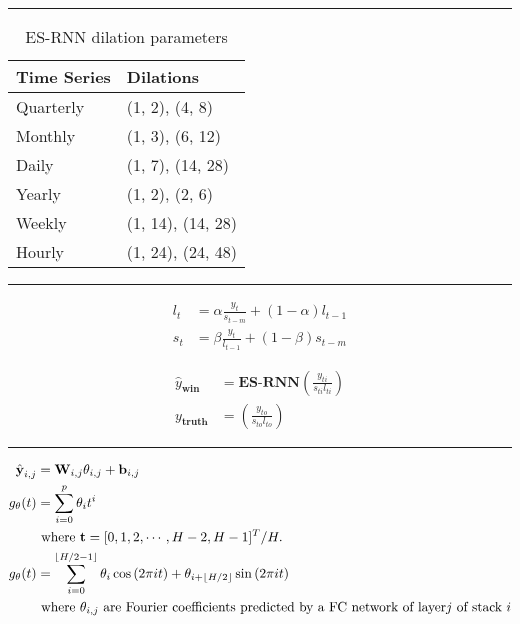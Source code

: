 \documentclass{article}
\DeclarePairedDelimiter\floor{\lfloor}{\rfloor}
\begin{document}
\par\noindent\rule{\textwidth}{0.4pt}

\begin{table}[!ht]
	\centering
	\begin{tabular}{ll} \toprule
		\textbf{Time Series} & \textbf{Dilations} \\ 
		\midrule
		Quarterly  & (1, 2), (4, 8)	\\
		\midrule
		Monthly 	& (1, 3), (6, 12)	\\
		\midrule
		Daily 	& (1, 7), (14, 28)	\\
		\midrule		
		Yearly 	& (1, 2), (2, 6) 	\\
		\midrule		
		Weekly 	& (1, 14), (14, 28)	\\
		\midrule		
		Hourly 	& (1, 24), (24, 48)	\\
		\bottomrule
	\end{tabular}
	\caption*{ES-RNN dilation parameters}
\end{table}

\par\noindent\rule{\textwidth}{0.4pt}

\begin{align*}
	l_t 	&= \alpha \frac{y_t} {s_{t-m}} + (1-\alpha) l_{t-1} \\
	s_t 	&= \beta \frac{y_t}{l_{t-1}} + (1-\beta) s_{t-m}
\end{align*}

\begin{align*}
	\hat{y}_{\textbf{win}}		&= \textbf{ES-RNN}(\frac{y_{ti}}{s_{ti} l_{ti}}) \\
	y_{\textbf{truth}}		&= (\frac{y_{to}}{s_{to} l_{to}}) 
\end{align*}

\par\noindent\rule{\textwidth}{0.4pt}

\begin{align*}
	\hat{\textbf{y}}_{i,j}	&= 	\textbf{W}_{i,j} \theta_{i,j}	+ \textbf{b}_{i,j} \\
		g_\theta (t)	&= 	\sum_{i=0}^p \theta_i t^i \\
					&	\text{ where } \textbf{t} = [0,1,2, \cdots, H-2, H-1]^T / H. \\
		g_\theta (t)	&= \sum_{i=0}^{\floor*{H/2-1}} \theta_i \cos{(2 \pi it)} + \theta_{i + \floor*{H/2}}  \sin{(2 \pi it)} \\
					&	\text{ where } \theta_{i,j} \text{ are Fourier coefficients predicted by a FC network of layer} j \text{ of stack } i
\end{align*}
\end{document}
